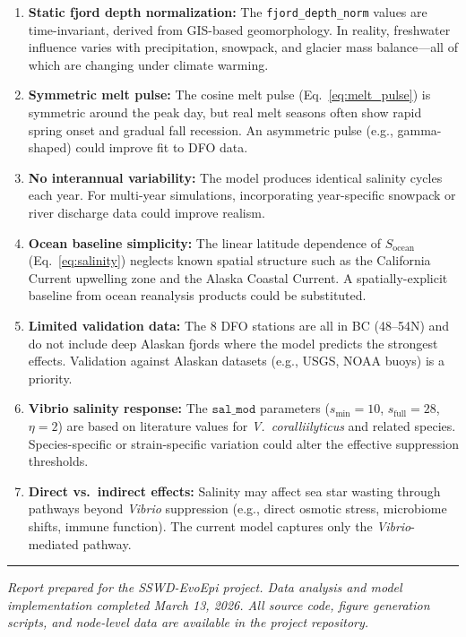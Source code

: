 \documentclass[11pt,a4paper]{article}
\begin{document}
\begin{enumerate}
    \item \textbf{Static fjord depth normalization:} The \texttt{fjord\_depth\_norm} values are time-invariant, derived from GIS-based geomorphology. In reality, freshwater influence varies with precipitation, snowpack, and glacier mass balance---all of which are changing under climate warming.

    \item \textbf{Symmetric melt pulse:} The cosine melt pulse (Eq.~\ref{eq:melt_pulse}) is symmetric around the peak day, but real melt seasons often show rapid spring onset and gradual fall recession. An asymmetric pulse (e.g., gamma-shaped) could improve fit to DFO data.

    \item \textbf{No interannual variability:} The model produces identical salinity cycles each year. For multi-year simulations, incorporating year-specific snowpack or river discharge data could improve realism.

    \item \textbf{Ocean baseline simplicity:} The linear latitude dependence of $S_{\text{ocean}}$ (Eq.~\ref{eq:salinity}) neglects known spatial structure such as the California Current upwelling zone and the Alaska Coastal Current. A spatially-explicit baseline from ocean reanalysis products could be substituted.

    \item \textbf{Limited validation data:} The 8 DFO stations are all in BC (48--54\textdegree N) and do not include deep Alaskan fjords where the model predicts the strongest effects. Validation against Alaskan datasets (e.g., USGS, NOAA buoys) is a priority.

    \item \textbf{Vibrio salinity response:} The $\texttt{sal\_mod}$ parameters ($s_{\text{min}} = 10$, $s_{\text{full}} = 28$, $\eta = 2$) are based on literature values for \textit{V.\ coralliilyticus} and related species. Species-specific or strain-specific variation could alter the effective suppression thresholds.

    \item \textbf{Direct vs.\ indirect effects:} Salinity may affect sea star wasting through pathways beyond \textit{Vibrio} suppression (e.g., direct osmotic stress, microbiome shifts, immune function). The current model captures only the \textit{Vibrio}-mediated pathway.
\end{enumerate}

\vspace{1.5em}
\noindent\rule{\textwidth}{0.4pt}

\vspace{0.5em}
\noindent\textit{Report prepared for the SSWD-EvoEpi project. Data analysis and model implementation completed March 13, 2026. All source code, figure generation scripts, and node-level data are available in the project repository.}
\end{document}
